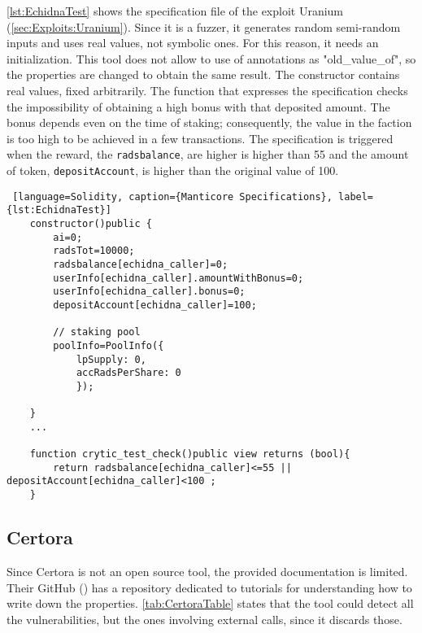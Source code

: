 \autoref{lst:EchidnaTest} shows the specification file of the exploit Uranium (\autoref*{sec:Exploits:Uranium}).
Since it is a fuzzer, it generates random semi-random inputs and uses real values, not symbolic ones.
For this reason, it needs an initialization.
This tool does not allow to use of annotations as "old\_value\_of", so the properties are changed to obtain the same result.
The constructor contains real values, fixed arbitrarily.
The function that expresses the specification checks the impossibility of obtaining a high bonus with that deposited amount.
The bonus depends even on the time of staking; consequently, the value in the faction is too high to be achieved in a few transactions.
The specification is triggered when the reward, the \texttt{radsbalance}, are higher is higher than 55 and the amount of token, \texttt{depositAccount},
is higher than the original value of 100.

\begin{lstlisting} [language=Solidity, caption={Manticore Specifications}, label={lst:EchidnaTest}]
    constructor()public {
        ai=0;
        radsTot=10000;
        radsbalance[echidna_caller]=0;
        userInfo[echidna_caller].amountWithBonus=0;
        userInfo[echidna_caller].bonus=0;
        depositAccount[echidna_caller]=100;
        
        // staking pool
        poolInfo=PoolInfo({
            lpSupply: 0,
            accRadsPerShare: 0
            });

    }
    ...
   
    function crytic_test_check()public view returns (bool){
        return radsbalance[echidna_caller]<=55 || depositAccount[echidna_caller]<100 ;
    }
\end{lstlisting} 

\subsection*{Certora} Since Certora is not an open source tool, the provided documentation is limited. 
Their GitHub (\cite{CertoraGitHub}) has a repository dedicated to tutorials for understanding how to write down the properties. 
\autoref{tab:CertoraTable} states that the tool could detect all the vulnerabilities, 
but the ones involving external calls, since it discards those.

